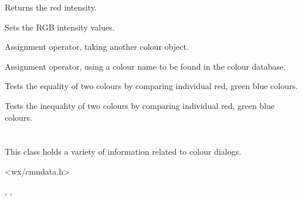 
Returns the red intensity.


\label{wxcolourset}


Sets the RGB intensity values.


\label{wxcolourassign}


Assignment operator, taking another colour object.


Assignment operator, using a colour name to be found in the colour database.




\label{wxcolourequality}


Tests the equality of two colours by comparing individual red, green blue colours.


\label{wxcolourinequality}


Tests the inequality of two colours by comparing individual red, green blue colours.

\section{}\label{wxcolourdata}

This class holds a variety of information related to colour dialogs.




<wx/cmndata.h>


, , 

